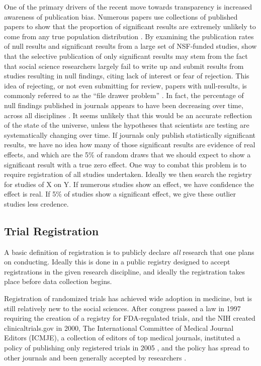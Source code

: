 \documentclass[12pt] {article}
\begin{document}
One of the primary drivers of the recent move towards transparency is
increased awareness of publication bias. Numerous papers use collections
of published papers to show that the proportion of significant results
are extremely unlikely to come from any true population distribution
\citep{delong_are_1992, gerber_testing_2001,  ioannidis_why_2005}. By examining the publication rates of null results and
significant results from a large set of NSF-funded studies, \cite{franco_publication_2014} show that the selective publication of only
significant results may stem from the fact that social science
researchers largely fail to write up and submit results from studies
resulting in null findings, citing lack of interest or fear of
rejection. This idea of rejecting, or not even submitting for review, papers with null-results, is commonly referred to as the ``file drawer problem'' \citep{rosenthal1979file}. In fact, the percentage of null findings published in
journals appears to have been decreasing over time, across all
disciplines \citep{fanelli_negative_2012}. It seems unlikely that this would
be an accurate reflection of the state of the universe, unless the hypotheses that scientists are testing are systematically changing over time. If journals only
publish statistically significant results, we have no idea how many of
those significant results are evidence of real effects, and which are
the 5\% of random draws that we should expect to show a significant
result with a true zero effect. One way to combat this problem is to
require registration of all studies undertaken. Ideally we then search
the registry for studies of X on Y. If numerous studies show an
effect, we have confidence the effect is real. If 5\% of studies show a
significant effect, we give these outlier studies less credence.

\subsection{Trial Registration}\label{trial-registration}

A basic definition of registration is to publicly declare \emph{all}
research that one plans on conducting. Ideally this is done in a public
registry designed to accept registrations in the given research discipline,
and ideally the registration takes place before data collection begins.

Registration of randomized trials has achieved wide adoption in medicine, but is still
relatively new to the social sciences. After congress passed a law in
1997 requiring the creation of a registry for FDA-regulated trials, and
the NIH created clinicaltrials.gov in 2000, The International Committee
of Medical Journal Editors (ICMJE), a collection of editors of top
medical journals, instituted a policy of publishing only registered
trials in 2005 \citep{DeAngelis2004}, and the policy has spread to
other journals and been generally accepted by researchers \citep{laine_clinical_2007}.
\end{document}
